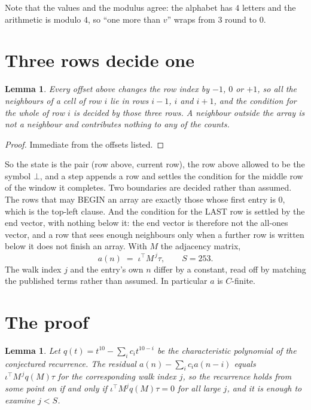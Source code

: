 \documentclass[11pt,a4paper]{article}
\theoremstyle{plain}
\newtheorem{lemma}[theorem]{Lemma}
\theoremstyle{definition}
\begin{document}
Note that the values and the modulus agree: the alphabet has $4$ letters and the arithmetic
is modulo $4$, so ``one more than $v$'' wraps from $3$ round to $0$.

\section{Three rows decide one}

\begin{lemma}\label{lem:win}
Every offset above changes the row index by $-1$, $0$ or $+1$, so all the neighbours of a cell
of row $i$ lie in rows $i-1$, $i$ and $i+1$, and the condition for the whole of row $i$ is
decided by those three rows. A neighbour outside the array is not a neighbour and contributes
nothing to any of the counts.
\end{lemma}

\begin{proof}
Immediate from the offsets listed.
\end{proof}

So the state is the pair (row above, current row), the row above allowed to be the symbol
$\bot$, and a step appends a row and settles the condition for the middle row of the window it
completes. Two boundaries are decided rather than assumed. The rows that may BEGIN an array are
exactly those whose first entry is $0$, which is the top-left clause. And the condition for the
LAST row is settled by the end vector, with nothing below it: the end vector is therefore not
the all-ones vector, and a row that sees enough neighbours only when a further row is written
below it does not finish an array. With $M$ the adjacency matrix,
\[
a(n)\;=\;\iota^{\!\top}M^{\,j}\tau ,\qquad S=253.
\]
The walk index $j$ and the entry's own $n$ differ by a constant, read off by matching the
published terms rather than assumed. In particular $a$ is $C$-finite.

\section{The proof}

\begin{lemma}\label{lem:crit}
Let $q(t)=t^{10}-\sum_i c_it^{10-i}$ be the characteristic polynomial of the
conjectured recurrence. The residual $a(n)-\sum_ic_ia(n-i)$ equals
$\iota^{\!\top}M^{\,j}q(M)\tau$ for the corresponding walk index $j$, so the recurrence
holds from some point on if and only if $\iota^{\!\top}M^{j}q(M)\tau=0$ for all large $j$,
and it is enough to examine $j<S$.
\end{lemma}
\end{document}
